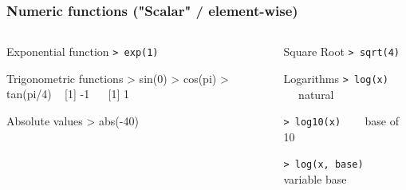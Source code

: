 \documentclass[ucs]{beamer}
\begin{document}
 \begin{frame}
  \frametitle{Numeric functions ("Scalar" / element-wise)}
    \begin{columns}[T]
    \begin{column}{0.5\textwidth}
      \begin{block}{Exponential function}
\texttt{> exp(1)} 
      \end{block}
  
  \begin{block}{Trigonometric functions }
\footnotesize \ttfamily>\! sin(0) >\! cos(pi) >\! tan(pi/4)  ~  [1] -1 ~~  [1] 1
    \end{block}
    \begin{block}{Absolute values}
\ttfamily > abs(-40) 
  \end{block}    
  
  
    \end{column}
    \begin{column}{0.5\textwidth}
      
        \begin{block}{Square Root}
        \texttt{> sqrt(4)}
      \end{block}

\begin{block}{Logarithms}
\texttt{> log(x) } ~~ natural \newline

\texttt{> log10(x) } ~~ base of 10 \newline

\texttt{> log(x, base) } ~~ variable base \newline
\end{block}


      
    \end{column}
  \end{columns}
\end{frame}
\end{document}
